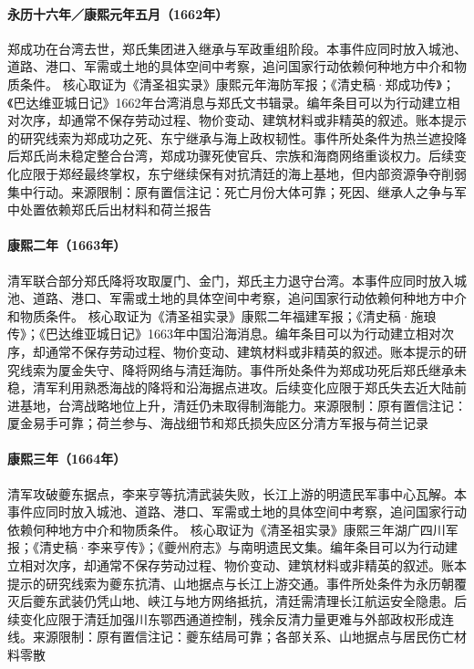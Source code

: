 \hypertarget{civic:EQ-1662-ZHENG-DEATH}{}\paragraph{永历十六年／康熙元年五月（1662年）}郑成功在台湾去世，郑氏集团进入继承与军政重组阶段。本事件应同时放入城池、道路、港口、军需或土地的具体空间中考察，追问国家行动依赖何种地方中介和物质条件。 核心取证为《清圣祖实录》康熙元年海防军报；《清史稿·郑成功传》；《巴达维亚城日记》1662年台湾消息与郑氏文书辑录。编年条目可以为行动建立相对次序，却通常不保存劳动过程、物价变动、建筑材料或非精英的叙述。账本提示的研究线索为郑成功之死、东宁继承与海上政权韧性。事件所处条件为热兰遮投降后郑氏尚未稳定整合台湾，郑成功骤死使官兵、宗族和海商网络重谈权力。后续变化应限于郑经最终掌权，东宁继续保有对抗清廷的海上基地，但内部资源争夺削弱集中行动。来源限制：原有置信注记：死亡月份大体可靠；死因、继承人之争与军中处置依赖郑氏后出材料和荷兰报告
\hypertarget{civic:EQ-1663-XIAMEN-JINMEN}{}\paragraph{康熙二年（1663年）}清军联合部分郑氏降将攻取厦门、金门，郑氏主力退守台湾。本事件应同时放入城池、道路、港口、军需或土地的具体空间中考察，追问国家行动依赖何种地方中介和物质条件。 核心取证为《清圣祖实录》康熙二年福建军报；《清史稿·施琅传》；《巴达维亚城日记》1663年中国沿海消息。编年条目可以为行动建立相对次序，却通常不保存劳动过程、物价变动、建筑材料或非精英的叙述。账本提示的研究线索为厦金失守、降将网络与清廷海防。事件所处条件为郑成功死后郑氏继承未稳，清军利用熟悉海战的降将和沿海据点进攻。后续变化应限于郑氏失去近大陆前进基地，台湾战略地位上升，清廷仍未取得制海能力。来源限制：原有置信注记：厦金易手可靠；荷兰参与、海战细节和郑氏损失应区分清方军报与荷兰记录
\hypertarget{civic:EQ-1664-KUIZHOU}{}\paragraph{康熙三年（1664年）}清军攻破夔东据点，李来亨等抗清武装失败，长江上游的明遗民军事中心瓦解。本事件应同时放入城池、道路、港口、军需或土地的具体空间中考察，追问国家行动依赖何种地方中介和物质条件。 核心取证为《清圣祖实录》康熙三年湖广四川军报；《清史稿·李来亨传》；《夔州府志》与南明遗民文集。编年条目可以为行动建立相对次序，却通常不保存劳动过程、物价变动、建筑材料或非精英的叙述。账本提示的研究线索为夔东抗清、山地据点与长江上游交通。事件所处条件为永历朝覆灭后夔东武装仍凭山地、峡江与地方网络抵抗，清廷需清理长江航运安全隐患。后续变化应限于清廷加强川东鄂西通道控制，残余反清力量更难与外部政权形成连线。来源限制：原有置信注记：夔东结局可靠；各部关系、山地据点与居民伤亡材料零散
